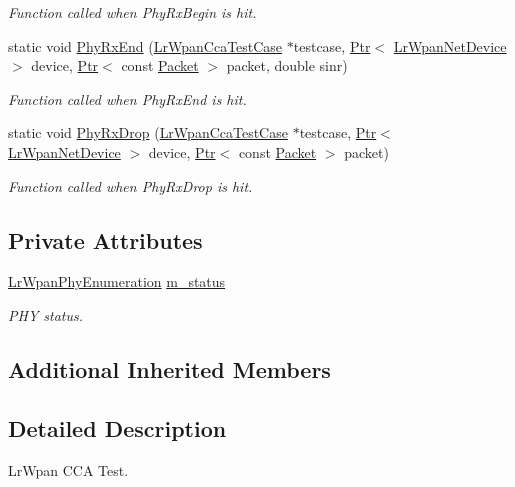 \begin{DoxyCompactItemize}
\begin{DoxyCompactList}\small\item\em Function called when Phy\+Rx\+Begin is hit. \end{DoxyCompactList}\item 
static void \hyperlink{classLrWpanCcaTestCase_aed133fe6504b326574ada94b6043abcf}{Phy\+Rx\+End} (\hyperlink{classLrWpanCcaTestCase}{Lr\+Wpan\+Cca\+Test\+Case} $\ast$testcase, \hyperlink{classns3_1_1Ptr}{Ptr}$<$ \hyperlink{classns3_1_1LrWpanNetDevice}{Lr\+Wpan\+Net\+Device} $>$ device, \hyperlink{classns3_1_1Ptr}{Ptr}$<$ const \hyperlink{classns3_1_1Packet}{Packet} $>$ packet, double sinr)
\begin{DoxyCompactList}\small\item\em Function called when Phy\+Rx\+End is hit. \end{DoxyCompactList}\item 
static void \hyperlink{classLrWpanCcaTestCase_a302ae211f206663a114fcd5a07752d5c}{Phy\+Rx\+Drop} (\hyperlink{classLrWpanCcaTestCase}{Lr\+Wpan\+Cca\+Test\+Case} $\ast$testcase, \hyperlink{classns3_1_1Ptr}{Ptr}$<$ \hyperlink{classns3_1_1LrWpanNetDevice}{Lr\+Wpan\+Net\+Device} $>$ device, \hyperlink{classns3_1_1Ptr}{Ptr}$<$ const \hyperlink{classns3_1_1Packet}{Packet} $>$ packet)
\begin{DoxyCompactList}\small\item\em Function called when Phy\+Rx\+Drop is hit. \end{DoxyCompactList}\end{DoxyCompactItemize}
\subsection*{Private Attributes}
\begin{DoxyCompactItemize}
\item 
\hyperlink{group__lr-wpan_ga6494269d13d45c511a07b7ccbb1de754}{Lr\+Wpan\+Phy\+Enumeration} \hyperlink{classLrWpanCcaTestCase_adbf2d30b281bb65318deaef492ceecd3}{m\+\_\+status}
\begin{DoxyCompactList}\small\item\em P\+HY status. \end{DoxyCompactList}\end{DoxyCompactItemize}
\subsection*{Additional Inherited Members}


\subsection{Detailed Description}
Lr\+Wpan C\+CA Test. 

